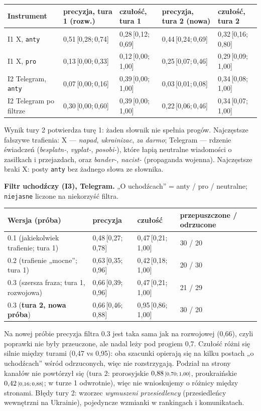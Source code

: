 \documentclass[10pt,a4paper]{article}
\newcommand{\ci}[3]{#1\,\mbox{\scriptsize[#2;\,#3]}}
\begin{document}
\begin{tabularx}{\linewidth}{@{}lXXXX@{}}
\toprule
Instrument & precyzja, tura 1 (rozw.) & czułość, tura 1 & precyzja, tura 2 (nowa) & czułość, tura 2 \\
\midrule
I1 X, \texttt{anty} & \ci{0{,}51}{0{,}28}{0{,}74} & \ci{0{,}28}{0{,}12}{0{,}69} & \ci{0{,}44}{0{,}24}{0{,}69} & \ci{0{,}32}{0{,}16}{0{,}80} \\
I1 X, \texttt{pro} & \ci{0{,}13}{0{,}00}{0{,}33} & \ci{0{,}12}{0{,}00}{1{,}00} & \ci{0{,}25}{0{,}07}{0{,}46} & \ci{0{,}29}{0{,}09}{1{,}00} \\
I2 Telegram, \texttt{anty} & \ci{0{,}07}{0{,}00}{0{,}16} & \ci{0{,}39}{0{,}00}{1{,}00} & \ci{0{,}03}{0{,}01}{0{,}08} & \ci{0{,}34}{0{,}08}{1{,}00} \\
I2 Telegram po filtrze & \ci{0{,}30}{0{,}00}{0{,}60} & \ci{0{,}39}{0{,}00}{1{,}00} & \ci{0{,}22}{0{,}06}{0{,}46} & \ci{0{,}34}{0{,}07}{1{,}00} \\
\bottomrule
\end{tabularx}
Wynik tury 2 potwierdza turę 1: żaden słownik nie spełnia progów. Najczęstsze fałszywe trafienia: X --- \emph{napad}, \emph{ukrainizac}, \emph{za darmo}; Telegram --- rdzenie świadczeń (\emph{besplatn-}, \emph{vyplat-}, \emph{posobi-}), które łapią neutralne wiadomości o zasiłkach i przejazdach, oraz \emph{bander-}, \emph{nacist-} (propaganda wojenna). Najczęstsze braki X: posty \texttt{anty} bez żadnego słowa ze słownika.

\textbf{Filtr uchodźczy (I3), Telegram.} „O uchodźcach” = anty / pro / neutralne; \texttt{niejasne} liczone na niekorzyść filtra.

\begin{tabularx}{\linewidth}{@{}lXXX@{}}
\toprule
Wersja (próba) & precyzja & czułość & przepuszczone / odrzucone \\
\midrule
0.1 (jakiekolwiek trafienie; tura 1) & \ci{0{,}48}{0{,}27}{0{,}78} & \ci{0{,}47}{0{,}21}{1{,}00} & 30 / 20 \\
0.2 (trafienie „mocne”; tura 1) & \ci{0{,}63}{0{,}35}{0{,}96} & \ci{0{,}42}{0{,}18}{1{,}00} & 20 / 30 \\
0.3 (szersza fraza; tura 1, rozwojowa) & \ci{0{,}66}{0{,}39}{0{,}96} & \ci{0{,}47}{0{,}21}{1{,}00} & 21 / 29 \\
0.3 (\textbf{tura 2, nowa próba}) & \ci{0{,}66}{0{,}46}{0{,}88} & \ci{0{,}95}{0{,}86}{1{,}00} & 30 / 20 \\
\bottomrule
\end{tabularx}
Na nowej próbie precyzja filtra 0.3 jest taka sama jak na rozwojowej (0,66), czyli poprawki nie były przeuczone, ale nadal leży pod progiem 0,7. Czułość różni się silnie między turami (0,47 vs 0,95): oba szacunki opierają się na kilku postach „o uchodźcach” wśród odrzuconych, więc nie rozstrzygają. Podział na strony kanałów nie powtórzył się (tura 2: prorosyjskie $\ci{0{,}88}{0{,}70}{1{,}00}$, proukraińskie $\ci{0{,}42}{0{,}16}{0{,}88}$; w turze 1 odwrotnie), więc nie wnioskujemy o różnicy między stronami. Błędy tury 2: wzorzec \emph{wymuszeni przesiedlency} (przesiedleńcy wewnętrzni na Ukrainie), pojedyncze wzmianki w rankingach i komunikatach.
\end{document}
